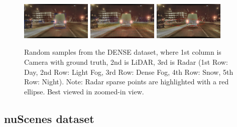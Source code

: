 \documentclass[report.tex]{subfiles}
\begin{document}
\begin{figure}[ht!]
            \includegraphics[width=0.3\textwidth]{images/datasets/dense/samples/night/2018-02-09_18-50-50_00300.png}\hfill
            \includegraphics[width=0.3\textwidth]{images/datasets/dense/samples/night/night_lidar.png}\hfill
            \includegraphics[width=0.3\textwidth]{images/datasets/dense/samples/night/night_radar_ann.png}
          
            \caption{Random samples from the DENSE dataset, where 1st column is Camera with ground truth, 2nd is LiDAR, 3rd is Radar (1st Row: Day, 2nd Row: Light Fog, 3rd Row: Dense Fog, 4th Row: Snow, 5th Row: Night). Note: Radar sparse points are highlighted with a red ellipse. Best viewed in zoomed-in view.}
            \label{fig:dense_samples}
          \end{figure}
          


    \subsection{nuScenes dataset}

\end{document}
